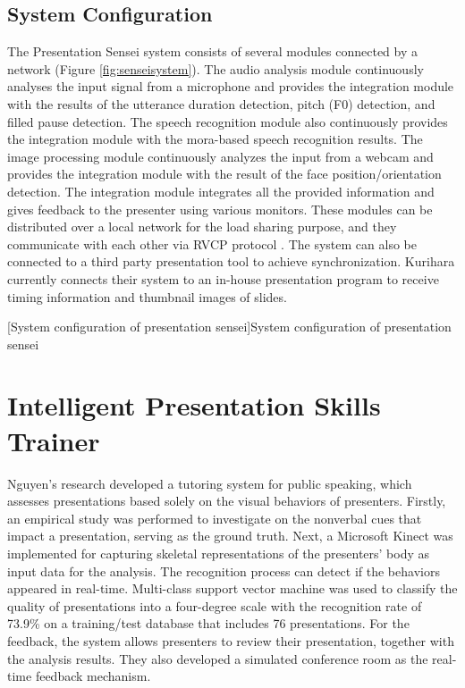 \subsection*{System Configuration}
\par The Presentation Sensei system consists of several modules connected by a network (Figure \ref{fig:senseisystem}). The audio analysis module continuously analyses the input signal from a microphone and provides the integration module with the results of the utterance duration detection, pitch (F0) detection, and filled pause detection. The speech recognition module also continuously provides the integration module with the mora-based speech recognition results. The image processing module continuously analyzes the input from a webcam and provides the integration module with the result of the face position/orientation detection. The integration module integrates all the provided information and gives feedback to the presenter using various monitors. These modules can be distributed over a local network for the load sharing purpose, and they communicate with each other via RVCP protocol \cite{Goto2001}. The system can also be connected to a third party presentation tool to achieve synchronization. Kurihara currently connects their system to an in-house presentation program to receive timing information and thumbnail images of slides.

[System configuration of presentation sensei]{System configuration of presentation sensei \cite{Kurihara2007}}

\section{Intelligent Presentation Skills Trainer}
\par Nguyen's research developed a tutoring system for public speaking, which assesses presentations based solely on the visual behaviors of presenters. Firstly, an empirical study was performed to investigate on the nonverbal cues that impact a presentation, serving as the ground truth. Next, a Microsoft Kinect was implemented for capturing skeletal representations of the presenters' body as input data for the analysis. The recognition process can detect if the behaviors appeared in real-time. Multi-class support vector machine was used to classify the quality of presentations into a four-degree scale with the recognition rate of 73.9\% on a training/test database that includes 76 presentations. For the feedback, the system allows presenters to review their presentation, together with the analysis results. They also developed a simulated conference room as the real-time feedback mechanism.
